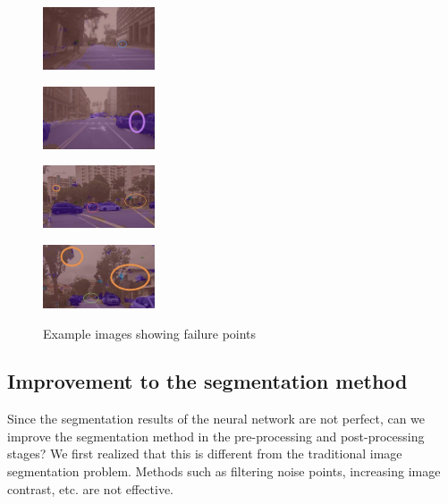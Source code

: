 \documentclass[8pt]{article}
\theoremstyle{nonumberplain}
\begin{document}
\begin{figure}[H]
	\centering
	\begin{minipage}[t]{0.23\textwidth}
		\centering
		\includegraphics[width=3.3cm]{fig6a.jpg}
		\subcaption{}
		\label{fig6a}
	\end{minipage}
	\begin{minipage}[t]{0.23\textwidth}
		\centering
		\includegraphics[width=3.3cm]{fig6b.jpg}
		\subcaption{}
		\label{fig6b}
	\end{minipage}
	\begin{minipage}[t]{0.23\textwidth}
		\centering
		\includegraphics[width=3.3cm]{fig6c.jpg}
		\subcaption{}
		\label{fig6c}
	\end{minipage}
	\begin{minipage}[t]{0.23\textwidth}
		\centering
		\includegraphics[width=3.3cm]{fig6d.jpg}
		\subcaption{}
		\label{fig6d}
	\end{minipage}
	\caption{Example images showing failure points}
	\label{fig6}
\end{figure} 


\subsection{Improvement to the segmentation method}

\hspace{1.0em}
Since the segmentation results of the neural network are not perfect, can we improve the segmentation method in the pre-processing and post-processing stages? We first realized that this is different from the traditional image segmentation problem. Methods such as filtering noise points, increasing image contrast, etc. are not effective.
\end{document}
